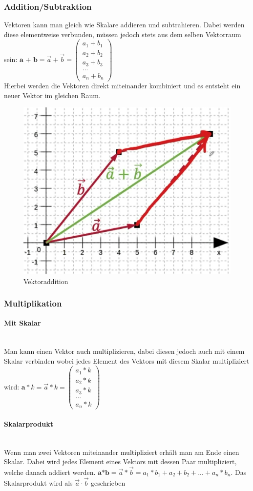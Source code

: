 \documentclass{article}
\newcommand{\paragraphlb}[1]{\paragraph{#1}\mbox{}\\}
\begin{document}
	\subsubsection{Addition/Subtraktion}
	Vektoren kann man gleich wie Skalare addieren und subtrahieren. Dabei werden diese elementweise verbunden, müssen jedoch stets aus dem selben Vektorraum sein: $\textbf{a + b}=\vec{a}+\vec{b}=\begin{pmatrix} a_1+b_1 \\ a_2+b_2 \\ a_3+b_3 \\ ... \\ a_n+b_n\end{pmatrix}$ \\
	Hierbei werden die Vektoren direkt miteinander kombiniert und es entsteht ein neuer Vektor im gleichen Raum.
	\begin{figure}[H]
	\centering
	\includegraphics[scale=0.5]{Bilder/vector_add.png}
	\caption{Vektoraddition}
	\end{figure}
	\subsubsection{Multiplikation}
	\paragraphlb{Mit Skalar}
	Man kann einen Vektor auch multiplizieren, dabei diesen jedoch auch mit einem Skalar verbinden wobei jedes Element des Vektors mit diesem Skalar multipliziert wird: $\textbf{a}*k=\vec{a}*k=\begin{pmatrix} a_1*k \\ a_2*k \\ a_3*k \\ ... \\ a_n*k\end{pmatrix}$ \\
	\paragraphlb{Skalarprodukt}
	Wenn man zwei Vektoren miteinander multipliziert erhält man am Ende einen Skalar. Dabei wird jedes Element eines Vektors mit dessen Paar multipliziert, welche danach addiert werden. $\textbf{a*b}=\vec{a}*\vec{b}=a_1*b_1+a_2+b_2+...+a_n*b_n$. Das Skalarprodukt wird als $\vec{a}\cdot\vec{b}$ geschrieben
\end{document}
